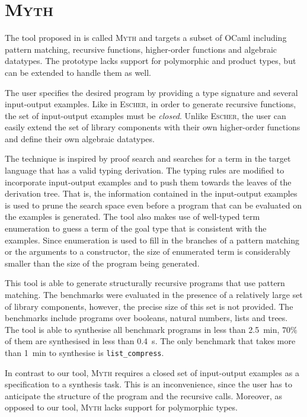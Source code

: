 \section{\mdseries\textsc{Myth}}

The tool proposed in \cite{MythPaper} is called \textsc{Myth} and targets a subset of OCaml including pattern matching, recursive functions, higher-order functions and algebraic datatypes. The prototype lacks support for polymorphic and product types, but can be extended to handle them as well.

The user specifies the desired program by providing a type signature and several input-output examples. Like in \textsc{Escher}, in order to generate recursive functions, the set of input-output examples must be \emph{closed}. Unlike \textsc{Escher}, the user can easily extend the set of library components with their own higher-order functions and define their own algebraic datatypes.

The technique is inspired by proof search and searches for a term in the target language that has a valid typing derivation. The typing rules are modified to incorporate input-output examples and to push them towards the leaves of the derivation tree. That is, the information contained in the input-output examples is used to prune the search space even before a program that can be evaluated on the examples is generated. The tool also makes use of well-typed term enumeration to guess a term of the goal type that is consistent with the examples. Since enumeration is used to fill in the branches of a pattern matching or the arguments to a constructor, the size of enumerated term is considerably smaller than the size of the program being generated.

This tool is able to generate structurally recursive programs that use pattern matching. The benchmarks were evaluated in the presence of a relatively large set of library components, however, the precise size of this set is not provided. The benchmarks include programs over booleans, natural numbers, lists and trees. The tool is able to synthesise all benchmark programs in less than \SI{2.5}{min}, $70\%$ of them are synthesised in less than \SI{0.4}{s}. The only benchmark that takes more than \SI{1}{min} to synthesise is \lstinline!list_compress!.

In contrast to our tool, \textsc{Myth} requires a closed set of input-output examples as a specification to a synthesis task. This is an inconvenience, since the user has to anticipate the structure of the program and the recursive calls. Moreover, as opposed to our tool, \textsc{Myth} lacks support for polymorphic types.


